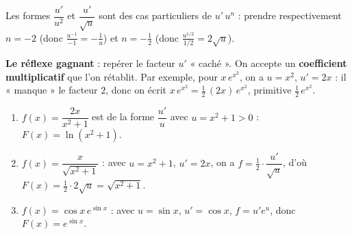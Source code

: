 \begin{remarque}
Les formes $\dfrac{u'}{u^{2}}$ et $\dfrac{u'}{\sqrt u}$ sont des cas particuliers de
$u'\,u^{n}$ : prendre respectivement $n=-2$ (donc $\frac{u^{-1}}{-1}=-\frac1u$) et
$n=-\frac12$ (donc $\frac{u^{1/2}}{1/2}=2\sqrt u$).
\end{remarque}

\begin{aretenir}
\textbf{Le réflexe gagnant} : repérer le facteur $u'$ « caché ». On accepte un \textbf{coefficient
multiplicatif} que l'on rétablit. Par exemple, pour $x\,e^{x^{2}}$, on a $u=x^{2}$, $u'=2x$ :
il « manque » le facteur $2$, donc on écrit $x\,e^{x^{2}}=\frac12\,(2x)\,e^{x^{2}}$, primitive $\frac12\,e^{x^{2}}$.
\end{aretenir}

\begin{exemple}
\begin{enumerate}[label=\alph*)]
\item $f(x)=\dfrac{2x}{x^{2}+1}$ est de la forme $\dfrac{u'}{u}$ avec $u=x^{2}+1>0$ :
$F(x)=\ln(x^{2}+1)$.
\item $f(x)=\dfrac{x}{\sqrt{x^{2}+1}}$ : avec $u=x^{2}+1$, $u'=2x$, on a
$f=\tfrac12\cdot\dfrac{u'}{\sqrt u}$, d'où $F(x)=\tfrac12\cdot2\sqrt u=\sqrt{x^{2}+1}$.
\item $f(x)=\cos x\,e^{\sin x}$ : avec $u=\sin x$, $u'=\cos x$, $f=u'e^{u}$, donc $F(x)=e^{\sin x}$.
\end{enumerate}
\end{exemple}

\begin{illus}
\end{illus}

